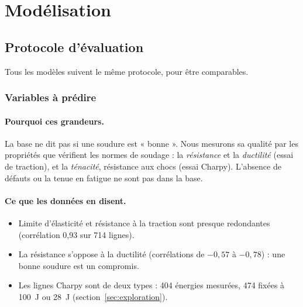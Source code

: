 \section{Modélisation}\label{sec:methodes}

\subsection{Protocole d'évaluation}\label{sec:protocole}

Tous les modèles suivent le même protocole, pour être comparables.

\subsubsection{Variables à prédire}\label{sec:qualite}

\paragraph{Pourquoi ces grandeurs.} La base ne dit pas si une soudure est « bonne ».
Nous mesurons sa qualité par les propriétés que vérifient les normes de soudage : la
\emph{résistance} et la \emph{ductilité} (essai de traction), et la \emph{ténacité},
résistance aux chocs (essai Charpy). L'absence de défauts ou la tenue en fatigue ne sont
pas dans la base.

\paragraph{Ce que les données en disent.}
\begin{itemize}
  \item Limite d'élasticité et résistance à la traction sont presque redondantes
    (corrélation 0,93 sur 714 lignes).
  \item La résistance s'oppose à la ductilité (corrélations de $-0{,}57$ à $-0{,}78$) :
    une bonne soudure est un compromis.
  \item Les lignes Charpy sont de deux types : 404 énergies mesurées, 474 fixées à
    \SI{100}{\joule} ou \SI{28}{\joule} (section~\ref{sec:exploration}).
\end{itemize}

